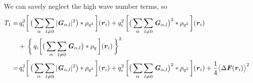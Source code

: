 \documentclass[aps,pre,preprint]{revtex4}
\renewcommand{\v}[1]{\textbf{\textit{#1}}}
\begin{document}
We can savely neglect the high wave number terms, so
\begin{align}\nonumber
  T_1
  = &\,
  q_i^2
  \bigg[\,
  \big(
  \sum_{\alpha} \sum_{l\neq 0}
  \vert \v G_{\alpha,l}\vert^2
  \big)
  \ast \rho_{q^2}
  \,\bigg] (\v r_i)
  +
  q_i^2\,
  \bigg[
  \big(
  \sum_{\alpha} \sum_{l\neq 0}  
  \v G_{\alpha,l}
  \big)^2
  \ast \rho_{q^2}\,
  \bigg] (\v r_i) \\\nonumber
  &+ \,
  \bigg\{\,
  q_i
  \bigg[
  \big(\sum_{\alpha}\sum_{l\neq 0}
  \v G_{\alpha,l}
  \big)
  \ast\rho_q\,
  \bigg] (\v r_i)
  \,\bigg\}^2  \\ \nonumber
  = &\,
  q_i^2
  \bigg[\,
  \big(
  \sum_{\alpha} \sum_{l\neq 0}
  \vert \v G_{\alpha,l}\vert^2
  \big)
  \ast \rho_{q^2}
  \,\bigg] (\v r_i)
  +
  q_i^2\,
  \bigg[
  \big(
  \sum_{\alpha} \sum_{l\neq 0}  
  \v G_{\alpha,l}
  \big)^2
  \ast \rho_{q^2}\,
  \bigg] (\v r_i)
  + 
  \frac14\big\langle\Delta\v F(\v r_i)\big\rangle^2
\end{align}
\end{document}
